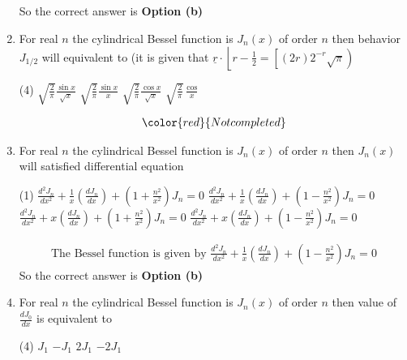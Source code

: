 \begin{enumerate}[label=\color{ocre}\textbf{\arabic*.}]
\begin{answer}
		So the correct answer is \textbf{Option (b)}
\end{answer}
\item For real $n$ the cylindrical Bessel function is $J_{n}(x)$ of order $n$ then behavior $J_{1 / 2}$ will equivalent to (it is given that $\underline{r} \cdot\left\lfloor r-\frac{1}{2}=\left[(2 r) 2^{-r} \sqrt{\pi}\right)\right.$
 \begin{tasks}(4)
	\task[\textbf{a.}] $\sqrt{\frac{2}{\pi}} \frac{\sin x}{\sqrt{x}}$
	\task[\textbf{b.}]$\sqrt{\frac{2}{\pi}} \frac{\sin x}{x}$
	\task[\textbf{c.}]$\sqrt{\frac{2}{\pi}} \frac{\cos x}{\sqrt{x}}$
	\task[\textbf{d.}] $\sqrt{\frac{2}{\pi}} \frac{\cos }{x}$
\end{tasks} 
\begin{answer}
	\begin{align*}
	{{\color{red}{Not completed}}}\\
	\end{align*}
\end{answer}
\item For real $n$ the cylindrical Bessel function is $J_{n}(x)$ of order $n$ then $J_{n}(x)$ will satisfied differential equation
 \begin{tasks}(1)
	\task[\textbf{a.}]$\frac{d^{2} J_{n}}{d x^{2}}+\frac{1}{x}\left(\frac{d J_{n}}{d x}\right)+\left(1+\frac{n^{2}}{x^{2}}\right) J_{n}=0$
	\task[\textbf{b.}] $\frac{d^{2} J_{n}}{d x^{2}}+\frac{1}{x}\left(\frac{d J_{n}}{d x}\right)+\left(1-\frac{n^{2}}{x^{2}}\right) J_{n}=0$
	\task[\textbf{c.}] $\frac{d^{2} J_{n}}{d x^{2}}+x\left(\frac{d J_{n}}{d x}\right)+\left(1+\frac{n^{2}}{x^{2}}\right) J_{n}=0$
	\task[\textbf{d.}] $\frac{d^{2} J_{n}}{d x^{2}}+x\left(\frac{d J_{n}}{d x}\right)+\left(1-\frac{n^{2}}{x^{2}}\right) J_{n}=0$
\end{tasks}
\begin{answer}
	\begin{align*}
\text{The Bessel function is given by }\frac{d^{2} J_{n}}{d x^{2}}+\frac{1}{x}\left(\frac{d J_{n}}{d x}\right)+\left(1-\frac{n^{2}}{x^{2}}\right) J_{n}=0
	\end{align*}
		So the correct answer is \textbf{Option (b)}
\end{answer}
\item For real $n$ the cylindrical Bessel function is $J_{n}(x)$ of order $n$ then value of $\frac{d J_{0}}{d x}$ is equivalent to 
 \begin{tasks}(4)
	\task[\textbf{a.}] $J_{1}$
	\task[\textbf{b.}]$-J_{1}$
	\task[\textbf{c.}]$2 J_{1}$
	\task[\textbf{d.}]$-2 J_{1}$
\end{tasks}

\end{enumerate}
